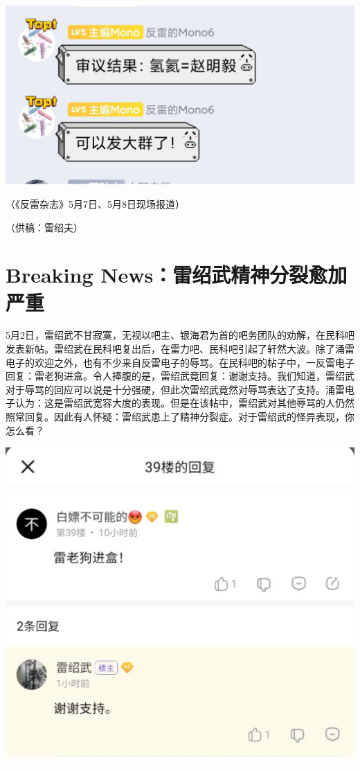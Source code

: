 \documentclass[UTF8,12pt,oneside]{ctexbook}
\begin{document}
        \begin{center}
            \includegraphics[scale=0.4]{2_fig1.png}
        \end{center}
        
        \hfill{（《反雷杂志》5月7日、5月8日现场报道）}
        
        \hfill{（供稿：雷绍夫）}
        
        \section{Breaking News：雷绍武精神分裂愈加严重 }
        
        5月2日，雷绍武不甘寂寞，无视以吧主、银海君为首的吧务团队的劝解，在民科吧发表新帖。雷绍武在民科吧复出后，在雷力吧、民科吧引起了轩然大波。除了涌雷电子的欢迎之外，也有不少来自反雷电子的辱骂。在民科吧的帖子中，一反雷电子回复：雷老狗进盒。令人捧腹的是，雷绍武竟回复：谢谢支持。我们知道，雷绍武对于辱骂的回应可以说是十分强硬，但此次雷绍武竟然对辱骂表达了支持。涌雷电子认为：这是雷绍武宽容大度的表现。但是在该帖中，雷绍武对其他辱骂的人仍然照常回复。因此有人怀疑：雷绍武患上了精神分裂症。对于雷绍武的怪异表现，你怎么看？
        
        
        \begin{center}
            \includegraphics[scale=0.45]{2_fig2.png}
        \end{center}
\end{document}
